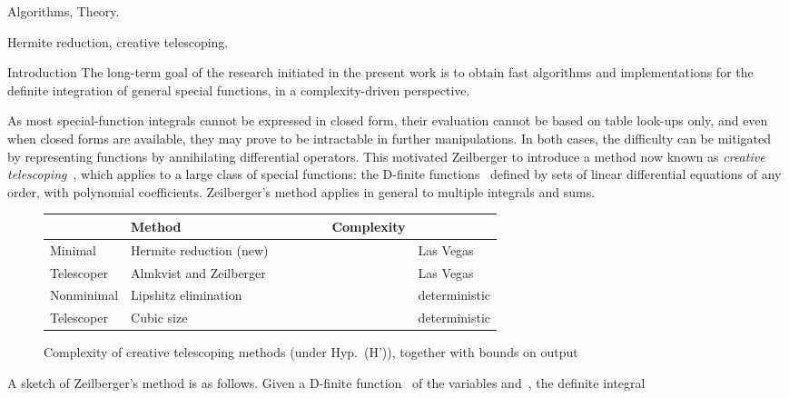 \documentclass{sig-alt-full}
\begin{document}
\vspace{1mm}
 Algorithms, Theory.

\vspace{1mm}
 Hermite reduction, creative telescoping.


\begin{section}{Introduction}
The long-term goal of the research initiated in the present work is to
obtain fast algorithms and implementations for the definite integration of
general special functions, in a complexity-driven perspective.

As most special-function integrals cannot be expressed in closed form,
their evaluation cannot be based on table look-ups only, and even when
closed forms are available, they may prove to be intractable in
further manipulations.  In both cases, the difficulty can be mitigated
by representing functions by annihilating differential operators.
This motivated Zeilberger to introduce a method now known as
\emph{creative telescoping\/}~\cite{Zeilberger1990}, which
applies to a large class of special functions:
the D-finite functions~\cite{Lipshitz1989} defined by
sets of linear differential equations of any order, with polynomial
coefficients.  Zeilberger's method applies in general to multiple
integrals and sums.

\begin{figure*} \begin{center} \renewcommand{\arraystretch}{1.2}
\begin{tabular}{l|l|ll|ll|ll}
  \hline
  & Method &  &  &  &  & Complexity & \\ \hline
  Minimal & Hermite reduction (new) &  &  &  &   &  & Las Vegas \\ \cline{2-8}
  Telescoper & Almkvist and Zeilberger &  &  &  &  &  & Las Vegas \\ \hline
  Nonminimal& Lipshitz elimination &  &  &  &  &  & deterministic \\\cline{2-8}
  Telescoper & Cubic size &  &  &  &  &  & deterministic \\\hline
\end{tabular}
\caption{Complexity of creative telescoping methods (under Hyp.~(H')), together with bounds on output}\label{fig:complexity}
\end{center}
\vskip-15pt
\end{figure*}




A sketch of Zeilberger's method is as follows.
Given a D-finite function~ of the variables
 and~, the definite integral


\end{section}
\end{document}
